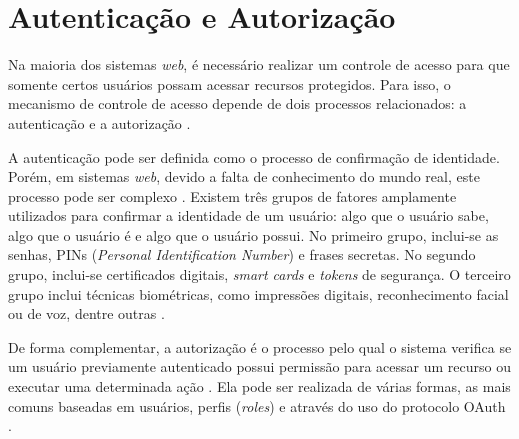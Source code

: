 \section{Autenticação e Autorização}

Na maioria dos sistemas \emph{web}, é necessário realizar um controle de acesso para que somente
certos usuários possam acessar recursos protegidos. Para isso, o mecanismo  de controle de
acesso depende de dois processos relacionados: a autenticação e a autorização
\cite{SULLIVAN2011}.

A autenticação pode ser definida como o processo de confirmação de identidade. Porém, em sistemas 
\emph{web}, devido a falta de conhecimento do mundo real, este processo pode ser complexo
\cite{CHAPMAN2012}. Existem três grupos de fatores amplamente utilizados para confirmar a
identidade de um usuário: algo que o usuário sabe, algo que o usuário é e algo que o usuário
possui. No primeiro grupo, inclui-se as senhas, PINs (\emph{Personal Identification Number}) e
frases secretas. No segundo grupo, inclui-se certificados digitais, \emph{smart cards} e
\emph{tokens} de segurança. O terceiro grupo inclui técnicas biométricas, como impressões
digitais, reconhecimento facial ou de voz, dentre outras \cite{SULLIVAN2011}.

De forma complementar, a autorização é o processo pelo qual o sistema verifica se um usuário 
previamente autenticado possui permissão para acessar um recurso ou executar uma determinada ação 
\cite{SPILCA2020}. Ela pode ser realizada de várias formas, as mais comuns baseadas em 
usuários, perfis (\emph{roles}) e através do uso do protocolo OAuth \cite{CHAPMAN2012}.